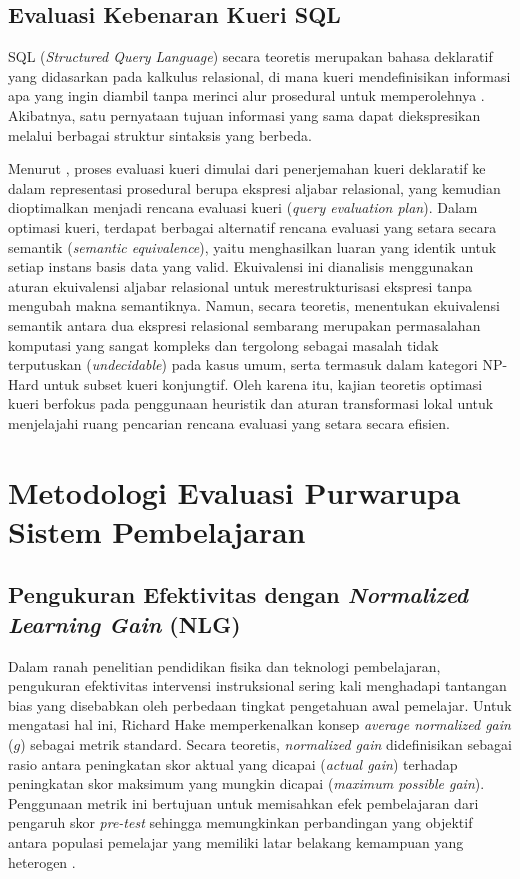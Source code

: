 \subsection{Evaluasi Kebenaran Kueri SQL}
\label{ssec:evaluasi_kueri_sql}
SQL (\textit{Structured Query Language}) secara teoretis merupakan bahasa deklaratif yang didasarkan pada kalkulus relasional, di mana kueri mendefinisikan informasi apa yang ingin diambil tanpa merinci alur prosedural untuk memperolehnya \autocite{Silberschatz2019}. Akibatnya, satu pernyataan tujuan informasi yang sama dapat diekspresikan melalui berbagai struktur sintaksis yang berbeda. 

Menurut \textcite{Silberschatz2019}, proses evaluasi kueri dimulai dari penerjemahan kueri deklaratif ke dalam representasi prosedural berupa ekspresi aljabar relasional, yang kemudian dioptimalkan menjadi rencana evaluasi kueri (\textit{query evaluation plan}). Dalam optimasi kueri, terdapat berbagai alternatif rencana evaluasi yang setara secara semantik (\textit{semantic equivalence}), yaitu menghasilkan luaran yang identik untuk setiap instans basis data yang valid. Ekuivalensi ini dianalisis menggunakan aturan ekuivalensi aljabar relasional untuk merestrukturisasi ekspresi tanpa mengubah makna semantiknya. Namun, secara teoretis, menentukan ekuivalensi semantik antara dua ekspresi relasional sembarang merupakan permasalahan komputasi yang sangat kompleks dan tergolong sebagai masalah tidak terputuskan (\textit{undecidable}) pada kasus umum, serta termasuk dalam kategori NP-Hard untuk subset kueri konjungtif. Oleh karena itu, kajian teoretis optimasi kueri berfokus pada penggunaan heuristik dan aturan transformasi lokal untuk menjelajahi ruang pencarian rencana evaluasi yang setara secara efisien.

\section{Metodologi Evaluasi Purwarupa Sistem Pembelajaran}
\label{sec:metodologi_evaluasi}

\subsection{Pengukuran Efektivitas dengan \textit{Normalized Learning Gain} (NLG)}
\label{ssec:nlg}
Dalam ranah penelitian pendidikan fisika dan teknologi pembelajaran, pengukuran
efektivitas intervensi instruksional sering kali menghadapi tantangan bias yang
disebabkan oleh perbedaan tingkat pengetahuan awal pemelajar. Untuk mengatasi hal
ini, Richard Hake memperkenalkan konsep \textit{average normalized gain} ($g$)
sebagai metrik standard. Secara teoretis, \textit{normalized gain} didefinisikan
sebagai rasio antara peningkatan skor aktual yang dicapai (\textit{actual gain})
terhadap peningkatan skor maksimum yang mungkin dicapai (\textit{maximum possible
gain}). Penggunaan metrik ini bertujuan untuk memisahkan efek pembelajaran dari
pengaruh skor \textit{pre-test} sehingga memungkinkan perbandingan yang objektif
antara populasi pemelajar yang memiliki latar belakang kemampuan yang heterogen
\autocite{Nissen2018}.

